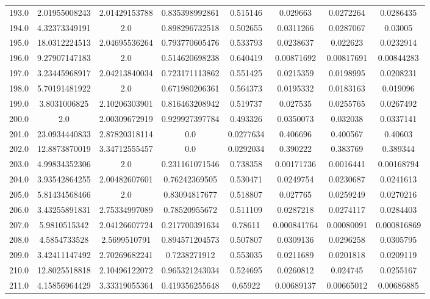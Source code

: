 \begin{longtable}{|c|c|c|c|c|c|c|c|}
193.0 & 2.01955008243 & 2.01429153788 & 0.835398992861 & 0.515146 & 0.029663 & 0.0272264 & 0.0286435 \\
194.0 & 4.32373349191 & 2.0 & 0.898296732518 & 0.502655 & 0.0311266 & 0.0287067 & 0.03005 \\
195.0 & 18.0312224513 & 2.04695536264 & 0.793770605476 & 0.533793 & 0.0238637 & 0.022623 & 0.0232914 \\
196.0 & 9.27907147183 & 2.0 & 0.514620698238 & 0.640419 & 0.00871692 & 0.00817691 & 0.00844283 \\
197.0 & 3.23445968917 & 2.04213840034 & 0.723171113862 & 0.551425 & 0.0215359 & 0.0198995 & 0.0208231 \\
198.0 & 5.70191481922 & 2.0 & 0.671980206361 & 0.564373 & 0.0195332 & 0.0183163 & 0.019096 \\
199.0 & 3.8031006825 & 2.10206303901 & 0.816463208942 & 0.519737 & 0.027535 & 0.0255765 & 0.0267492 \\
200.0 & 2.0 & 2.00309672919 & 0.929927397784 & 0.493326 & 0.0350073 & 0.032038 & 0.0337141 \\
201.0 & 23.0934440833 & 2.87820318114 & 0.0 & 0.0277634 & 0.406696 & 0.400567 & 0.40603 \\
202.0 & 12.8873870019 & 3.34712555457 & 0.0 & 0.0292034 & 0.390222 & 0.383769 & 0.389344 \\
203.0 & 4.99834352306 & 2.0 & 0.231161071546 & 0.738358 & 0.00171736 & 0.0016441 & 0.00168794 \\
204.0 & 3.93542864255 & 2.00482607601 & 0.76242369505 & 0.530471 & 0.0249754 & 0.0230687 & 0.0241613 \\
205.0 & 5.81434568466 & 2.0 & 0.83094817677 & 0.518807 & 0.027765 & 0.0259249 & 0.0270216 \\
206.0 & 3.43255891831 & 2.75334997089 & 0.78520955672 & 0.511109 & 0.0287218 & 0.0274117 & 0.0284403 \\
207.0 & 5.9810515342 & 2.04126607724 & 0.217700391634 & 0.78611 & 0.000841764 & 0.00080091 & 0.000816869 \\
208.0 & 4.5854733528 & 2.5699510791 & 0.894571204573 & 0.507807 & 0.0309136 & 0.0296258 & 0.0305795 \\
209.0 & 3.42411147492 & 2.70269682241 & 0.7238271912 & 0.553035 & 0.0211689 & 0.0201818 & 0.0209119 \\
210.0 & 12.8025518818 & 2.10496122072 & 0.965321243034 & 0.524695 & 0.0260812 & 0.024745 & 0.0255167 \\
211.0 & 4.15856964429 & 3.33319055364 & 0.419356255648 & 0.65922 & 0.00689137 & 0.00665012 & 0.00686885 \\

\end{longtable}
